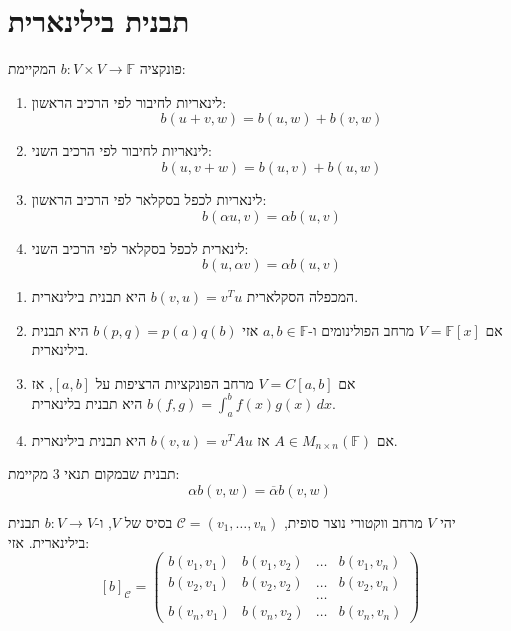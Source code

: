 \documentclass{tstextbook}
\begin{document}
\section{תבנית בילינארית}

\begin{definition}
פונקציה \(b:V\times V\rightarrow \mathbb F\) המקיימת:

  \begin{enumerate}
    \item לינאריות לחיבור לפי הרכיב הראשון: 
$$b(u+v,w)=b(u,w)+b(v,w)$$


    \item לינאריות לחיבור לפי הרכיב השני: 
$$b(u,v+w)=b(u,v)+b(u,w)$$


    \item לינאריות לכפל בסקלאר לפי הרכיב הראשון: 
$$b(\alpha u,v)=\alpha b(u,v)$$


    \item לינארית לכפל בסקלאר לפי הרכיב השני: 
$$b\left( u,\alpha v \right)=\alpha b(u,v)$$


  \end{enumerate}
\end{definition}
\begin{example}
  \begin{enumerate}
    \item המכפלה הסקלארית \(b(v,u)=v^{T}u\) היא תבנית בילינארית. 


    \item אם \(V=\mathbb{F} [x]\) מרחב הפולינומים ו-\(a,b \in \mathbb{F}\) אזי \(b(p,q)=p(a)q(b)\) היא תבנית בילינארית. 


    \item אם \(V=C[a,b]\) מרחב הפונקציות הרציפות על \([a,b]\), אז \(b(f,g)=\int_{a}^{b} f(x)g(x) \, dx\) היא תבנית בלינארית. 


    \item אם \(A \in M_{n\times n}\left( \mathbb{F}  \right)\) אז \(b(v,u)=v^{T}Au\) היא תבנית בילינארית. 


  \end{enumerate}
\end{example}
\begin{definition}
תבנית שבמקום תנאי 3 מקיימת:
$$ \alpha b(v, w) = \overline \alpha b( v, w )$$

\end{definition}
\begin{definition}
יהי \(V\) מרחב ווקטורי נוצר סופית, \(\mathcal{C}=\left( v_{1},\dots,v_{n} \right)\) בסיס של \(V\), ו-\(b:V\to V\) תבנית בילינארית. אזי:
$$[b]_{\mathcal{C} }=\begin{pmatrix}b(v_{1},v_{1})&b(v_{1},v_{2})&\dots&b(v_{1},v_{n})\\ b(v_{2},v_{1})&b(v_{2},v_{2})&\dots&b(v_{2},v_{n})\\ &&\dots\\ b(v_{n},v_{1})&b(v_{n},v_{2})&\dots&b(v_{n},v_{n})\end{pmatrix}$$

\end{definition}
\end{document}
